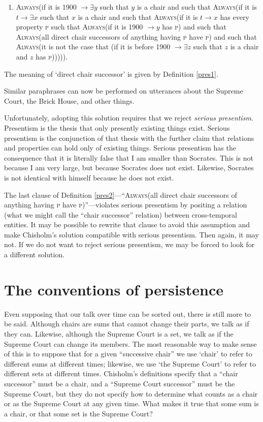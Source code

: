 \documentclass[12pt,twoside]{reedfancy}
\begin{document}
\begin{spacing}{1.25}
\begin{enumerate}[label=2a.]
  \item \textsc{Always}(if it is 1900 $\rightarrow \exists y$ such
    that $y$ is a chair and such that \textsc{Always}(if it is $t
    \rightarrow \exists x$ such that $x$ is a chair and such that
    \textsc{Always}(if it is $t \rightarrow x$ has every property
    \textsc{p} such that \textsc{Always}(if it is 1900 $\rightarrow y$
    has \textsc{p}) and such that \textsc{Always}(all direct chair
    successors of anything having \textsc{p} have \textsc{p}) and such
    that \textsc{Always}(it is not the case that (if it is before 1900
    $\rightarrow \exists z$ such that $z$ is a chair and $z$ has
    \textsc{p}))))).
\end{enumerate}
The meaning of `direct chair successor' is given by Definition
\ref{pres1}.

Similar paraphrases can now be performed on utterances about the
Supreme Court, the Brick House, and other things.

Unfortunately, adopting this solution requires that we reject {\em
  serious presentism}.  Presentism is the thesis that only presently
existing things exist.  Serious presentism is the conjunction of that
thesis with the further claim that relations and properties can hold
only of existing things.  Serious presentism has the consequence that
it is literally false that I am smaller than Socrates.  This is not
because I am very large, but because Socrates does not exist.
Likewise, Socrates is not identical with himself because he does not
exist.

The last clause of Definition \ref{pres2}---``\textsc{Always}(all
direct chair successors of anything having \textsc{p} have
\textsc{p})''---violates serious presentism by positing a relation
(what we might call the ``chair successor'' relation) between
cross-temporal entities.  It may be possible to rewrite that clause to
avoid this assumption and make Chisholm's solution compatible with
serious presentism.  Then again, it may not.  If we do not want to
reject serious presentism, we may be forced to look for a different
solution.

\section{The conventions of persistence}
\label{set-convention}
Even supposing that our talk over time can be sorted out, there is
still more to be said.  Although chairs are sums that cannot change
their parts, we talk as if they can.  Likewise, although the Supreme
Court is a set, we talk as if the Supreme Court can change its
members.  The most reasonable way to make sense of this is to suppose
that for a given ``successive chair'' we use `chair' to refer to
different sums at different times; likewise, we use `the Supreme
Court' to refer to different sets at different times.  Chisholm's
definitions specify that a ``chair successor'' must be a chair, and a
``Supreme Court successor'' must be the Supreme Court, but they do not
specify how to determine what counts as a chair or as the Supreme
Court at any given time.  What makes it true that some sum is a chair,
or that some set is the Supreme Court?


\end{spacing}
\end{document}

